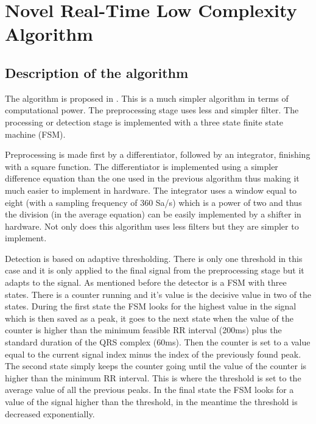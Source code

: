\documentclass{article}
\begin{document}
\section{Novel Real-Time Low Complexity Algorithm}

\subsection{Description of the algorithm}

The algorithm is proposed in \cite{rivas}. This is a much simpler algorithm in terms of computational power. The preprocessing stage uses less and simpler filter. The processing or detection stage is implemented with a three state finite state machine (FSM).

Preprocessing is made first by a differentiator, followed by an integrator, finishing with a square function. The differentiator is implemented using a simpler difference equation than the one used in the previous algorithm thus making it much easier to implement in hardware. The integrator uses a window equal to eight (with a sampling frequency of 360 Sa/s) which is a power of two and thus the division (in the average equation) can be easily implemented by a shifter in hardware. Not only does this algorithm uses less filters but they are simpler to implement.

Detection is based on adaptive thresholding. There is only one threshold in this case and it is only applied to the final signal from the preprocessing stage but it adapts to the signal. As mentioned before the detector is a FSM with three states. There is a counter running and it's value is the decisive value in two of the states. During the first state the FSM looks for the highest value in the signal which is then saved as a peak, it goes to the next state when the value of the counter is higher than the minimum feasible RR interval (200ms) plus the standard duration of the QRS complex (60ms). Then the counter is set to a value equal to the current signal index minus the index of the previously found peak. The second state simply keeps the counter going  until the value of the counter is higher than the minimum RR interval. This is where the threshold is set to the average value of all the previous peaks. In the final state the FSM looks for a value of the signal higher than the threshold, in the meantime the threshold is decreased exponentially. 
\end{document}
